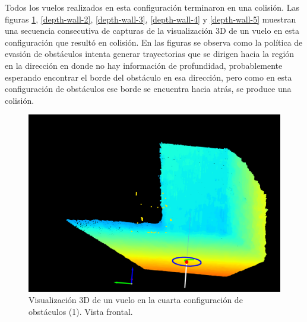 Todos los vuelos realizados en esta configuración terminaron en una colisión. Las figuras \ref{depth-wall-1}, \ref{depth-wall-2}, \ref{depth-wall-3}, \ref{depth-wall-4} y \ref{depth-wall-5} muestran una secuencia consecutiva de capturas de la visualización 3D de un vuelo en esta configuración que resultó en colisión. En las figuras se observa como la política de evasión de obstáculos intenta generar trayectorias que se dirigen hacia la región en la dirección  en donde no hay información de profundidad, probablemente esperando encontrar el borde del obstáculo en esa dirección, pero como en esta configuración de obstáculos ese borde se encuentra hacia atrás, se produce una colisión.

\begin{figure}[H]
    \centering
    \includegraphics[scale=0.23]{partes/img/depth-wall-1-front.png}
    \caption[Visualización 3D de un vuelo en la cuarta configuración de obstáculos (1). Vista frontal.]{Visualización 3D de un vuelo en la cuarta configuración de obstáculos (1). Vista frontal.}
    \label{depth-wall-1}
\end{figure}

